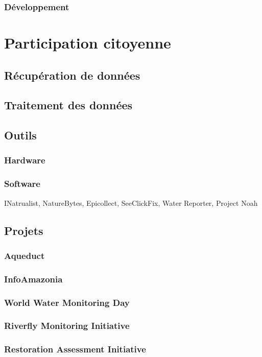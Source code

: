\documentclass[10pt, conference, compsocconf]{llncs}
\begin{document}
		\subsubsection{Développement}
		
\section{Participation citoyenne}
	\subsection{Récupération de données}
	\subsection{Traitement des données}
	\subsection{Outils}
		\subsubsection{Hardware}
		\subsubsection{Software}
		INatrualist, NatureBytes, Epicollect, SeeClickFix, Water Reporter, Project Noah		

	\subsection{Projets}
		\subsubsection{Aqueduct}
		\subsubsection{InfoAmazonia}
		\subsubsection{World Water Monitoring Day}
		\subsubsection{Riverfly Monitoring Initiative}
		\subsubsection{Restoration Assessment Initiative}
\end{document}
